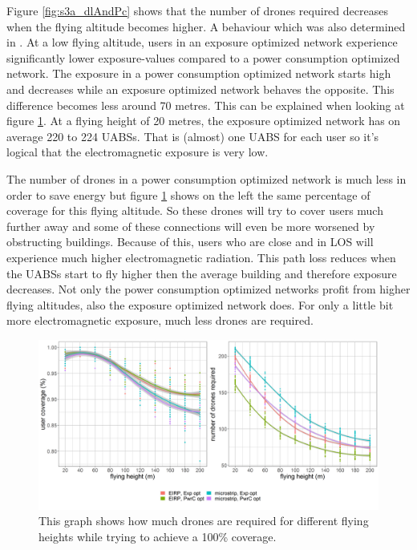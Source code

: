 Figure \ref{fig:s3a_dlAndPc}  shows that the number of drones required decreases when the flying altitude becomes higher. A behaviour which was also determined in \cite{J2}.
At a low flying altitude, users in an exposure optimized network experience significantly lower exposure-values compared to a power consumption optimized network.
The exposure in a power consumption  optimized network starts high and 
decreases while an exposure optimized network behaves the opposite. This difference becomes less 
around 70 metres.
This can be explained when looking at figure \ref{fig:s3a_numDronesAndCov}.
At a flying height of 20 metres, the exposure optimized network has on average 220 to 224 \gls{UABS}s. That is (almost) one \gls{UABS} for each user
so it's logical that the electromagnetic exposure is very low.

The number of drones in a power consumption optimized network is much less in order 
to save energy but figure \ref{fig:s3a_numDronesAndCov} shows on the  left the same percentage of coverage for this flying altitude.
So these drones will try to cover users much further away and some of these connections will even be more worsened by obstructing buildings.
Because of this, users who are close and in \gls{LOS} will experience much higher electromagnetic radiation.
This path loss reduces when the \gls{UABS}s start to fly higher then the average  building and therefore exposure decreases.
Not only the power consumption optimized networks profit from higher flying altitudes, also the exposure optimized network does. For only a little bit 
more electromagnetic exposure, much less drones are required.

\begin{figure}[]
  \includegraphics[width=\textwidth]{../results/s3/fhvsnumdronesAndCov.png}
  \caption{This graph shows how much drones are required for different flying heights while trying to achieve a 100\% coverage.}
  \label{fig:s3a_numDronesAndCov}
\end{figure}

